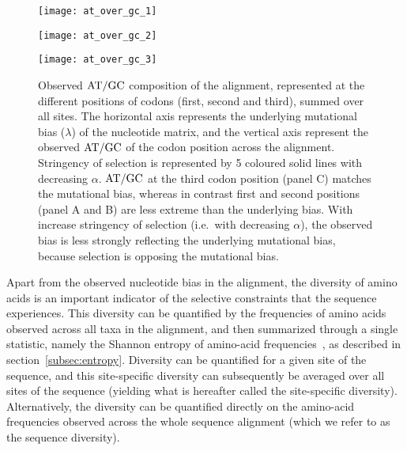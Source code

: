 \begin{figure}[htbp]
    \centering
    \begin{minipage}{0.32\linewidth}
        \texttt{[image: at\_over\_gc\_1]}
    \end{minipage}
    \hfill
    \begin{minipage}{0.32\linewidth}
        \texttt{[image: at\_over\_gc\_2]}
    \end{minipage}
    \hfill
    \begin{minipage}{0.32\linewidth}
        \texttt{[image: at\_over\_gc\_3]}
    \end{minipage}
    \hfill
    \caption[$\atgc$ composition of the alignment]{
    Observed $\atgc$ composition of the alignment, represented at the different positions of \glspl{codon} (first, second and third), summed over all sites.
    The horizontal axis represents the underlying mutational bias ($\lambda$) of the nucleotide matrix, and the vertical axis represent the observed $\atgc$ of the \gls{codon} position across the alignment.
    Stringency of selection is represented by 5 coloured solid lines with decreasing $\alpha$.
    $\atgc$ at the third \gls{codon} position (panel C) matches the mutational bias, whereas in contrast first and second positions (panel A and B) are less extreme than the underlying bias.
    With increase stringency of selection (i.e.~with decreasing $\alpha$), the observed bias is less strongly reflecting the underlying mutational bias, because selection is opposing the mutational bias.}
    \label{fig:mut-bias-AT-GC-obs}
\end{figure}

Apart from the observed nucleotide bias in the alignment, the diversity of amino acids is an important indicator of the selective constraints that the sequence experiences.
This diversity can be quantified by the frequencies of amino acids observed across all taxa in the alignment, and then summarized through a single statistic, namely the Shannon entropy of amino-acid frequencies~\citep{Goldstein2017}, as described in section~\ref{subsec:entropy}.
Diversity can be quantified for a given site of the sequence, and this site-specific diversity can subsequently be averaged over all sites of the sequence (yielding what is hereafter called the site-specific diversity).
Alternatively, the diversity can be quantified directly on the amino-acid frequencies observed across the whole sequence alignment (which we refer to as the sequence diversity).

